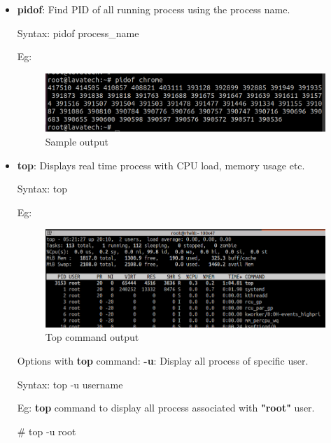 \begin{flushleft}
\begin{itemize}
	\bigskip
	\bigskip
	
	\item \textbf{pidof}: Find PID of all running process using the process name.
	\bigskip
	\begin{tcolorbox}[breakable,notitle,boxrule=-0pt,colback=pink,colframe=pink]
		\color{black}
		\font=9pt
		Syntax: pidof process\_name
		\font=4pt
	\end{tcolorbox}
	
	Eg:
	\begin{figure}[h!]
		\centering
		\includegraphics[scale=.35]{content/chapter12/images/pidof.png}
		\caption{Sample output}
		\label{fig:process23454922}
	\end{figure}
	
	
	\item \textbf{top}: Displays real time process with CPU load, memory usage etc.
	\bigskip
	\begin{tcolorbox}[breakable,notitle,boxrule=-0pt,colback=pink,colframe=pink]
		\color{black}
		\font=9pt
		Syntax: top
		\font=4pt
	\end{tcolorbox}

	Eg:	
	\bigskip
	\begin{figure}[h!]
		\centering
		\includegraphics[scale=0.3]{content/chapter12/images/top_command.png}
		\caption{Top command output}
		\label{fig:top_command_output}
	\end{figure}
	Options with \textbf{top} command:
	\newline
	\textbf{-u}: Display all process of specific user.
	\bigskip
	\begin{tcolorbox}[breakable,notitle,boxrule=-0pt,colback=pink,colframe=pink]
		\color{black}
		\font=9pt
		Syntax: top -u username
		\font=4pt
	\end{tcolorbox}
	
	Eg: \textbf{top} command to display all process associated with \textbf{"root"} user.
	\begin{tcolorbox}[breakable,notitle,boxrule=-0pt,colback=black,colframe=black]
		\color{green}
		\font=9pt
		\#  top -u root
		\font=4pt
	\end{tcolorbox}
		
		
	\end{itemize}

\end{flushleft}

\newpage


